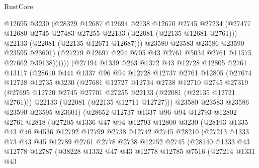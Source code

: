 \begin{lexlean}{RustCore}
\begin{coremodule}
                  @12695
                  @3230
                  (@28329
                    @12687
                    @12694
                    @2738
                    @12670
                    @2745
                    @27234
                    (@27477 @12680 @2745 @27483 @27255 @22133 (@22081 (@22135 @12681 @2761)))
                    @22133
                    (@22081 (@22135 @12671 @12687)))
                  @23580
                  @23583
                  @23586
                  @23590
                  @23595
                  @23601)
                (@27279 @12697 @294 @705 @43 @2761 @5034 @2761 @11575 @27662 @39138))))))
      (@27194
        @1339
        @263
        @1372
        @43
        @12728
        @12805
        @2761
        @13117
        (@28610
          @441
          @1337
          @96
          @94
          @12728
          @12737
          @2761
          @12805
          (@27674
            @12728
            @12735
            @3230
            (@27681
              @12727
              @12734
              @2738
              @12710
              @2745
              @27319
              (@27695 @12720 @2745 @27701 @27255 @22133 (@22081 (@22135 @12721 @2761)))
              @22133
              (@22081 (@22135 @12711 @12727)))
            @23580
            @23583
            @23586
            @23590
            @23595
            @23601)
          (@28652
            @12737
            @1337
            @96
            @94
            @12793
            @12802
            @2761
            @2818
            (@27205
              @1336
              @47
              @94
              @12793
              @12800
              @3230
              (@28193
                @1335
                @43
                @46
                @4536
                @12792
                @12799
                @2738
                @12742
                @2745
                @28210
                (@27213
                  @1333
                  @73
                  @43
                  @45
                  @12789
                  @2761
                  @2778
                  @2738
                  @12752
                  @2745
                  (@28140
                    @1333
                    @43
                    @12778
                    @12787
                    (@38228
                      @1332
                      @47
                      @43
                      @12778
                      @12785
                      @7516
                      (@27214
                        @1331
                        @43

\end{coremodule}
\end{lexlean}

